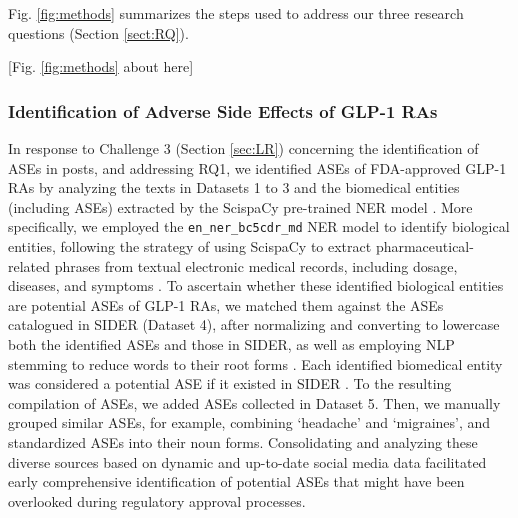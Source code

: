 \documentclass[referee,bst/sn-basic]{sn-jnl}%
\theoremstyle{thmstyletwo}%
\theoremstyle{thmstylethree}%
\begin{document}
Fig. \ref{fig:methods} summarizes the steps used to address our three research questions (Section \ref{sect:RQ}).

\begin{center}
[Fig. \ref{fig:methods} about here] 
\end{center}

\begin{comment}
    
\begin{figure}[H]
    \centering
    \texttt{[image: images/methods.pdf]}
    \caption{Overview of the methodology of this research.}
    \label{fig:methods}
\end{figure}

\end{comment}
\subsubsection{Identification of Adverse Side Effects of GLP-1 RAs} 
\label{sec:ASE}
In response to Challenge 3 (Section \ref{sec:LR}) concerning the identification of ASEs in posts, and addressing RQ1, we identified ASEs of FDA-approved GLP-1 RAs by analyzing the texts in Datasets 1 to 3 and the biomedical entities (including ASEs) extracted by the ScispaCy pre-trained NER model \cite{neumann2019scispacy}.
More specifically, we employed the \texttt{en\_ner\_bc5cdr\_md} NER model to identify biological entities, following the strategy of using ScispaCy to extract pharmaceutical-related phrases from textual electronic medical records, including dosage, diseases, and symptoms \cite{tarcar2019healthcare}.
To ascertain whether these identified biological entities are potential ASEs of GLP-1 RAs, we matched them against the ASEs catalogued in SIDER \cite{kuhn2016sider} 
(Dataset 4), after normalizing and converting to lowercase both the identified ASEs and those in SIDER, as well as employing NLP stemming to reduce words to their root forms \cite{jivani2011comparative}.
Each identified biomedical entity was considered a potential ASE if it existed in SIDER \cite{kuhn2016sider}.
To the resulting compilation of ASEs, we added ASEs collected in Dataset 5. 
Then, we manually grouped similar ASEs, for example, combining `headache' and `migraines', and standardized ASEs into their noun forms. 
Consolidating and analyzing these diverse sources based on dynamic and up-to-date social media data facilitated early comprehensive identification of potential ASEs that might have been overlooked during regulatory approval processes.
\end{document}
